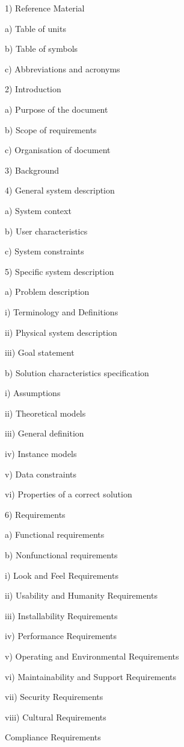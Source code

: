 \documentclass{article}
\begin{document}
{ 1) Reference Material}

{ a) Table of units}

{ b) Table of symbols}

{ c) Abbreviations and acronyms}

{ 2) Introduction}

{ a) Purpose of the document}

{ b) Scope of requirements}

{ c) Organisation of document}

{ 3) Background~}

{ 4) General system description}

{ a) System context}

{ b) User characteristics}

{ c) System constraints}

{ 5) Specific system description}

{ a) Problem description}

{ i) Terminology and Definitions}

{ ii) Physical system description}

{ iii) Goal statement}

{ b) Solution characteristics specification}

{ i) Assumptions}

{ ii) Theoretical models}

{ iii) General definition}

{ iv) Instance models}

{ v) Data constraints}

{ vi) Properties of a correct solution}

{ 6) Requirements}

{ a) Functional requirements}

{ b) Nonfunctional requirements}

{ i) Look and Feel Requirements}

{ ii) Usability and Humanity Requirements}

{ iii) Installability Requirements}

{ iv) Performance Requirements}

{ v) Operating and Environmental Requirements}

{ vi) Maintainability and Support Requirements}

{ vii) Security Requirements~}

{ viii) Cultural Requirements}

{ Compliance Requirements}

\newpage
\end{document}
